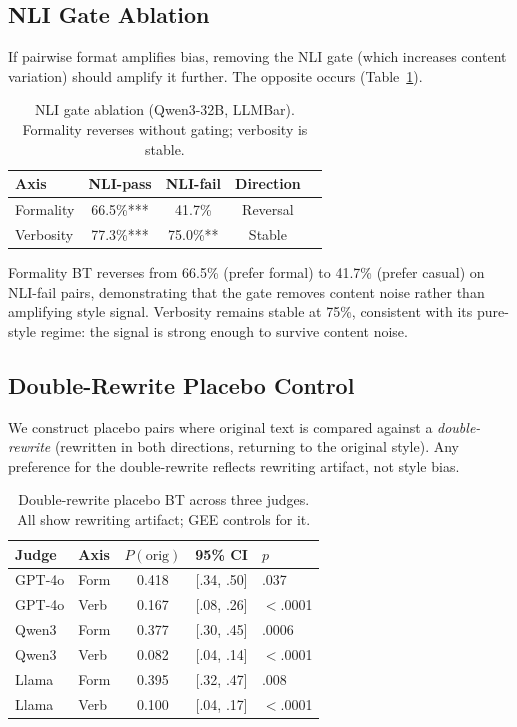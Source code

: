 \documentclass[11pt,twocolumn]{article}
\begin{document}
\subsection{NLI Gate Ablation}
\label{sec:nli_ablation}

If pairwise format amplifies bias, removing the NLI gate (which increases content variation) should amplify it further. The opposite occurs (Table~\ref{tab:nli_ablation}).

\begin{table}[t]
\centering
\small
\caption{NLI gate ablation (Qwen3-32B, LLMBar). Formality reverses without gating; verbosity is stable.}
\label{tab:nli_ablation}
\begin{tabular}{@{}lcccc@{}}
\toprule
Axis & NLI-pass & NLI-fail & Direction \\
\midrule
Formality & 66.5\%*** & 41.7\% & Reversal \\
Verbosity & 77.3\%*** & 75.0\%** & Stable \\
\bottomrule
\end{tabular}
\vspace{-2mm}
\end{table}

Formality BT reverses from 66.5\% (prefer formal) to 41.7\% (prefer casual) on NLI-fail pairs, demonstrating that the gate removes content noise rather than amplifying style signal. Verbosity remains stable at 75\%, consistent with its pure-style regime: the signal is strong enough to survive content noise.

\subsection{Double-Rewrite Placebo Control}
\label{sec:placebo}

We construct placebo pairs where original text is compared against a \emph{double-rewrite} (rewritten in both directions, returning to the original style). Any preference for the double-rewrite reflects rewriting artifact, not style bias.

\begin{table}[t]
\centering
\small
\caption{Double-rewrite placebo BT across three judges. All show rewriting artifact; GEE controls for it.}
\label{tab:placebo}
\begin{tabular}{@{}llccl@{}}
\toprule
Judge & Axis & $P(\text{orig})$ & 95\% CI & $p$ \\
\midrule
GPT-4o & Form & 0.418 & [.34, .50] & .037 \\
GPT-4o & Verb & 0.167 & [.08, .26] & $<$.0001 \\
Qwen3 & Form & 0.377 & [.30, .45] & .0006 \\
Qwen3 & Verb & 0.082 & [.04, .14] & $<$.0001 \\
Llama & Form & 0.395 & [.32, .47] & .008 \\
Llama & Verb & 0.100 & [.04, .17] & $<$.0001 \\
\bottomrule
\end{tabular}
\vspace{-2mm}
\end{table}
\end{document}
